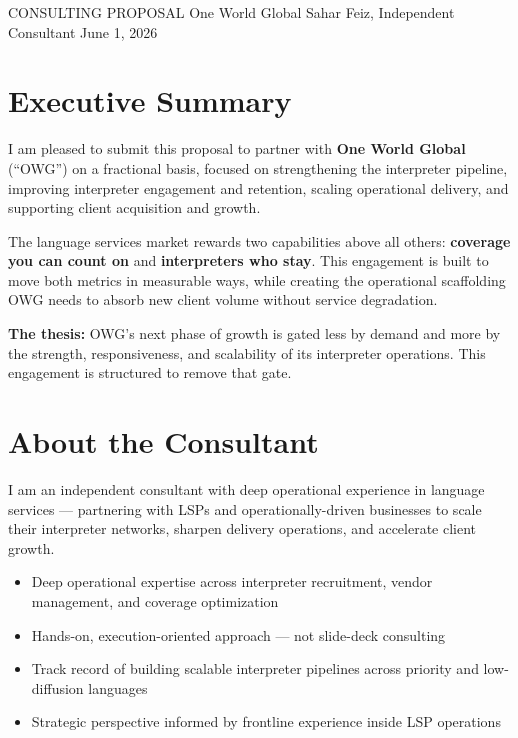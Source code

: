 \documentclass{proposal}
\begin{document}
\proposaltitle
  {CONSULTING PROPOSAL}
  {One World Global}
  {Sahar Feiz, Independent Consultant}
  {June 1, 2026}

\section{Executive Summary}

I am pleased to submit this proposal to partner with \textbf{One World Global}
(``OWG'') on a fractional basis, focused on strengthening the interpreter
pipeline, improving interpreter engagement and retention, scaling operational
delivery, and supporting client acquisition and growth.

The language services market rewards two capabilities above all others:
\textbf{coverage you can count on} and \textbf{interpreters who stay}. This
engagement is built to move both metrics in measurable ways, while creating
the operational scaffolding OWG needs to absorb new client volume without
service degradation.

\begin{clausebox}
\sffamily\small
\textbf{The thesis:} OWG's next phase of growth is gated less by demand and
more by the strength, responsiveness, and scalability of its interpreter
operations. This engagement is structured to remove that gate.
\end{clausebox}

\section{About the Consultant}

I am an independent consultant with deep operational experience in language
services --- partnering with LSPs and operationally-driven businesses to
scale their interpreter networks, sharpen delivery operations, and accelerate
client growth.

\begin{itemize}[leftmargin=1.5em, itemsep=4pt, topsep=4pt]
  \item Deep operational expertise across interpreter recruitment, vendor
        management, and coverage optimization
  \item Hands-on, execution-oriented approach --- not slide-deck consulting
  \item Track record of building scalable interpreter pipelines across
        priority and low-diffusion languages
  \item Strategic perspective informed by frontline experience inside LSP
        operations
\end{itemize}
\end{document}
